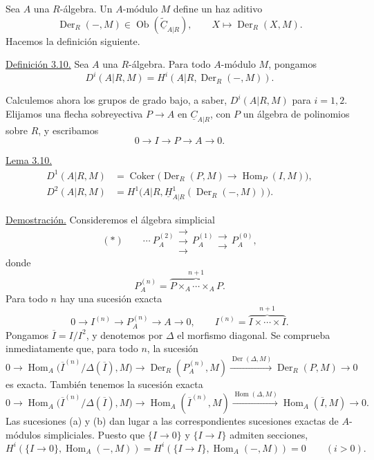 
Sea $A$ una $R$-álgebra. Un $A$-módulo $M$ define un haz aditivo
\[
 \operatorname{Der}_R(-,M)
 \in\operatorname{Ob}(\widetilde{\underline C}_{A|R}),
 \qquad X\longmapsto\operatorname{Der}_R(X,M).
\]
Hacemos la definición siguiente.

\underline{Definición 3.10.} Sea $A$ una $R$-álgebra. Para todo
$A$-módulo $M$, pongamos
\[
 D^i(A|R,M)=H^i(A|R,\operatorname{Der}_R(-,M)).
\]

Calculemos ahora los grupos de grado bajo, a saber, $D^i(A|R,M)$ para
$i=1,2$. Elijamos una flecha sobreyectiva
$P\longrightarrow A$ en $\underline C_{A|R}$, con $P$ un álgebra de
polinomios sobre $R$, y escribamos
\[
 0\longrightarrow I\longrightarrow P\longrightarrow A
 \longrightarrow0.
\]

\underline{Lema 3.10.}
\begin{align*}
 D^1(A|R,M)
 &=\operatorname{Coker}\bigl(
   \operatorname{Der}_R(P,M)\longrightarrow
   \operatorname{Hom}_P(I,M)\bigr),\\
 D^2(A|R,M)
 &=H^1\bigl(A|R,
   \underline H^1_{A|R}(\operatorname{Der}_R(-,M))\bigr).
\end{align*}

\underline{Demostración.} Consideremos el álgebra simplicial
\[
 (*)\qquad
 \cdots\ P_A^{(2)}
 \mathrel{\substack{\longrightarrow\\[-.6ex]\longrightarrow\\[-.6ex]\longrightarrow}}
 P_A^{(1)}
 \mathrel{\substack{\longrightarrow\\[-.6ex]\longrightarrow}}
 P_A^{(0)},
\]
donde
\[
 P_A^{(n)}=
 \overbrace{P\times_A\cdots\times_AP}^{n+1}.
\]
Para todo $n$ hay una sucesión exacta
\[
 0\longrightarrow I^{(n)}\longrightarrow P_A^{(n)}
 \longrightarrow A\longrightarrow0,
 \qquad
 I^{(n)}=\overbrace{I\times\cdots\times I}^{n+1}.
\]
Pongamos $\overline I=I/I^2$, y denotemos por $\Delta$ el morfismo
diagonal. Se comprueba inmediatamente que, para todo $n$, la sucesión
\[
 0\longrightarrow
 \operatorname{Hom}_A
 \bigl(\overline I^{(n)}/\Delta(\overline I),M\bigr)
 \longrightarrow\operatorname{Der}_R(P_A^{(n)},M)
 \xrightarrow{\operatorname{Der}(\Delta,M)}
 \operatorname{Der}_R(P,M)\longrightarrow0
 \tag{a}
\]
es exacta. También tenemos la sucesión exacta
\[
 0\longrightarrow
 \operatorname{Hom}_A
 \bigl(\overline I^{(n)}/\Delta(\overline I),M\bigr)
 \longrightarrow\operatorname{Hom}_A(\overline I^{(n)},M)
 \xrightarrow{\operatorname{Hom}(\Delta,M)}
 \operatorname{Hom}_A(\overline I,M)\longrightarrow0.
 \tag{b}
\]
Las sucesiones (a) y (b) dan lugar a las correspondientes sucesiones
exactas de $A$-módulos simpliciales. Puesto que
$\{I\longrightarrow0\}$ y $\{I\longrightarrow I\}$ admiten secciones,
\[
 H^i(\{I\longrightarrow0\},\operatorname{Hom}_A(-,M))
 =H^i(\{I\longrightarrow I\},\operatorname{Hom}_A(-,M))=0
 \qquad(i>0).
\]

